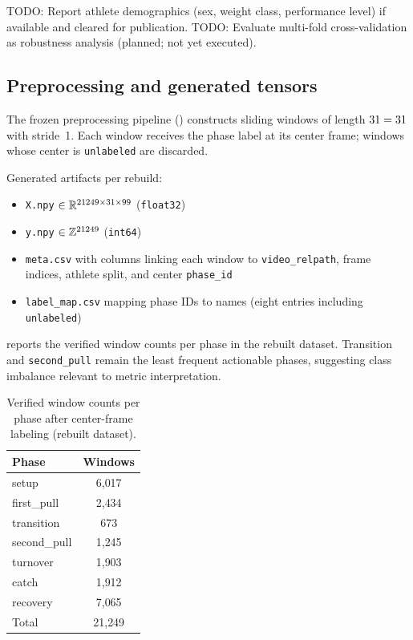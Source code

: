 \textsc{TODO:} Report athlete demographics (sex, weight class, performance level) if available and cleared for publication.
\textsc{TODO:} Evaluate multi-fold cross-validation as robustness analysis (planned; not yet executed).

\subsection{Preprocessing and generated tensors}
\label{sec:dataset:preprocessing}

The frozen preprocessing pipeline () constructs sliding windows of length $31 = 31$ with stride~1.
Each window receives the phase label at its center frame; windows whose center is \texttt{unlabeled} are discarded.

Generated artifacts per rebuild:
\begin{itemize}
  \item \texttt{X.npy} $\in \mathbb{R}^{21249 \times 31 \times 99}$ (\texttt{float32})
  \item \texttt{y.npy} $\in \mathbb{Z}^{21249}$ (\texttt{int64})
  \item \texttt{meta.csv} with columns linking each window to \texttt{video\_relpath}, frame indices, athlete split, and center \texttt{phase\_id}
  \item \texttt{label\_map.csv} mapping phase IDs to names (eight entries including \texttt{unlabeled})
\end{itemize}

 reports the verified window counts per phase in the rebuilt dataset.
Transition and \texttt{second\_pull} remain the least frequent actionable phases, suggesting class imbalance relevant to metric interpretation.

\begin{table}[t]
  \centering
  \caption{Verified window counts per phase after center-frame labeling (rebuilt dataset).}
  \label{tab:class_distribution}
  \begin{tabular}{lc}
    \toprule
    Phase & Windows \\
    \midrule
    setup & 6{,}017 \\
    first\_pull & 2{,}434 \\
    transition & 673 \\
    second\_pull & 1{,}245 \\
    turnover & 1{,}903 \\
    catch & 1{,}912 \\
    recovery & 7{,}065 \\
    \midrule
    Total & 21{,}249 \\
    \bottomrule
  \end{tabular}
\end{table}


